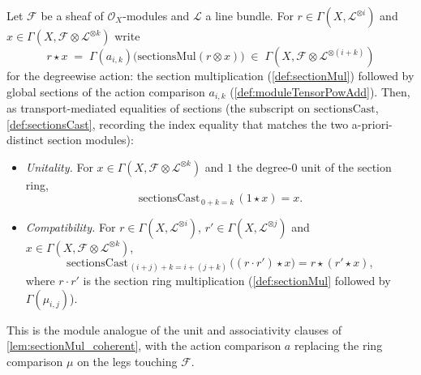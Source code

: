 \begin{lemma}
  \label{lem:moduleSectionAction_coherent}
  Let \(\mathcal{F}\) be a sheaf of \(\mathcal{O}_X\)-modules and \(\mathcal{L}\) a
  line bundle. For \(r\in\Gamma(X,\mathcal{L}^{\otimes i})\) and
  \(x\in\Gamma(X,\mathcal{F}\otimes\mathcal{L}^{\otimes k})\) write
  \[
    r\star x \;=\; \Gamma(a_{i,k})\bigl(\mathrm{sectionsMul}(r\otimes x)\bigr)
      \;\in\;\Gamma(X,\mathcal{F}\otimes\mathcal{L}^{\otimes(i+k)})
  \]
  for the degreewise action: the section multiplication (\cref{def:sectionMul})
  followed by global sections of the action comparison \(a_{i,k}\)
  (\cref{def:moduleTensorPowAdd}). Then, as transport-mediated equalities of sections
  (the subscript on \(\mathrm{sectionsCast}\), \cref{def:sectionsCast}, recording the
  index equality that matches the two a-priori-distinct section modules):
  \begin{itemize}
    \item \emph{Unitality.} For \(x\in\Gamma(X,\mathcal{F}\otimes
      \mathcal{L}^{\otimes k})\) and \(1\) the degree-\(0\) unit of the section ring,
      \[ \mathrm{sectionsCast}_{\,0+k=k}\,(1\star x) = x. \]
    \item \emph{Compatibility.} For \(r\in\Gamma(X,\mathcal{L}^{\otimes i})\),
      \(r'\in\Gamma(X,\mathcal{L}^{\otimes j})\) and
      \(x\in\Gamma(X,\mathcal{F}\otimes\mathcal{L}^{\otimes k})\),
      \[ \mathrm{sectionsCast}_{\,(i+j)+k=i+(j+k)}\,\bigl((r\cdot r')\star x\bigr)
        = r\star(r'\star x), \]
      where \(r\cdot r'\) is the section ring multiplication (\cref{def:sectionMul}
      followed by \(\Gamma(\mu_{i,j})\)).
  \end{itemize}
  This is the module analogue of the unit and associativity clauses of
  \cref{lem:sectionMul_coherent}, with the action comparison \(a\) replacing the
  ring comparison \(\mu\) on the legs touching \(\mathcal{F}\).
\end{lemma}

